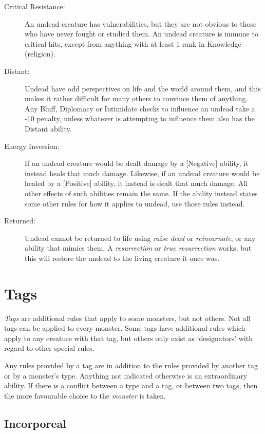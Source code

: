 \documentclass[10pt]{article}
\begin{document}
\begin{description}
\item[Critical Resistance:] An undead creature has vulnerabilities, but they are not obvious to those who have never fought or studied them. An undead creature is immune to critical hits, except from anything with at least 1 rank in Knowledge (religion).
\item[Distant:] Undead have odd perspectives on life and the world around them, and this makes it rather difficult for many others to convince them of anything. Any Bluff, Diplomacy or Intimidate checks to influence an undead take a -10 penalty, unless whatever is attempting to influence them also has the Distant ability.
\item[Energy Inversion:] If an undead creature would be dealt damage by a [Negative] ability, it instead heals that much damage. Likewise, if an undead creature would be healed by a [Positive] ability, it instead is dealt that much damage. All other effects of such abilities remain the same. If the ability instead states some other rules for how it applies to undead, use those rules instead.
\item[Returned:] Undead cannot be returned to life using {\em raise dead} or {\em reincarnate}, or any ability that mimics them. A {\em resurrection} or {\em true resurrection} works, but this will restore the undead to the living creature it once was.
\end{description}

\section{Tags}

{\em Tags} are additional rules that apply to some monsters, but not others. Not all tags can be applied to every monster. Some tags have additional rules which apply to any creature with that tag, but others only exist as `designators' with regard to other special rules.

Any rules provided by a tag are in addition to the rules provided by another tag or by a monster's type. Anything not indicated otherwise is an extraordinary ability. If there is a conflict between a type and a tag, or between two tags, then the more favourable choice to the {\em monster} is taken.

\subsection{Incorporeal}
\end{document}
